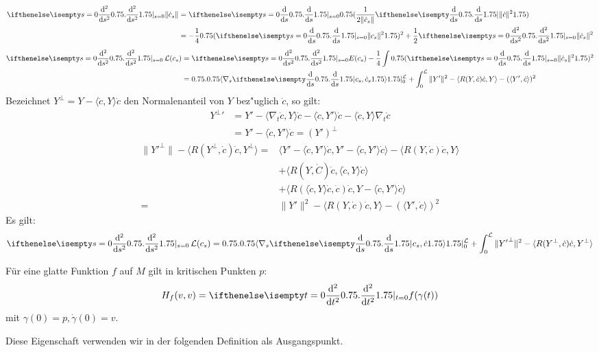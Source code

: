 \begin{align*}
  \difffrac[s=0]{^2}{s^2} \| \dot c_s \| &= \difffrac[s=0]{}{s} \left( \frac{1}{2 \| \dot c_s \|} \difffrac{}{s} \| \dot c \|^2 \right) \\
  &= - \frac{1}{4} \left( \difffrac[s=0]{}{s} \| c_s \|^2 \right)^2 +
  \frac{1}{2} \difffrac[s=0]{^2}{s^2} \| \dot c_s \|^2
\end{align*}
\begin{align*}
  \difffrac[s=0]{^2}{s^2} \calL(c_s) &= \difffrac[s=0]{^2}{s^2} E(c_s) - \frac{1}{4} \int \left( \difffrac[s=0]{}{s} \| \dot c_s \|^2 \right)^2 \\
  &= \left.\left\langle \nabla_s \difffrac{}{s} c_s, \dot c_s
    \right\rangle\right|_{0}^{\calL} + \int_0^{\calL} \| Y' \|^2 -
  \langle R(Y, \dot c) \dot c, Y \rangle - ( \langle Y', \dot c
  \rangle )^2
\end{align*}
Bezeichnet $Y^\perp = Y - \langle \dot c, Y \rangle \dot c$ den
Normalenanteil von $Y$ bez"uglich $\dot c$, so gilt:
\begin{align*}
  {Y^\perp}' &= Y' - \langle \nabla_t \dot c, Y \rangle \dot c - \langle \dot c, Y' \rangle \dot c - \langle \dot c, Y \rangle \nabla_t \dot c \\
  &= Y' - \langle \dot c, Y' \rangle \dot c = (Y')^\perp
\end{align*}
\begin{align*}
  \| {Y'}^\perp \| - \langle R(Y^\perp, \dot c) \dot c, Y^\perp \rangle ={}& \langle Y' - \langle \dot c, Y' \rangle \dot c, Y' - \langle \dot c, Y' \rangle \dot c \rangle - \langle R(Y, \dot c) \dot c, Y \rangle \\
  & + \langle R(Y, \dot C) \dot c, \langle \dot c, Y \rangle \dot c \rangle \\
  & + \langle R ( \langle \dot c, Y \rangle \dot c, \dot c) \dot c, Y - \langle \dot c, Y' \rangle \dot c \rangle \\
  ={}& \| Y' \|^2 - \langle R(Y, \dot c) \dot c, Y \rangle - ( \langle
  Y', \dot c \rangle )^2
\end{align*}
Es gilt:
\begin{align*}
  \difffrac[s=0]{^2}{s^2} \calL(c_s) = \left.\left\langle \nabla_s
      \difffrac{}{s} c_s, \dot c \right\rangle\right|_{0}^{\calL} +
  \int_0^{\calL} \| {Y'}^\perp \|^2 - \langle R(Y^\perp, \dot c) \dot
  c, Y^\perp \rangle
\end{align*}


\begin{emptythm}[Erinnerung]
  Für eine glatte Funktion $f$ auf $M$ gilt in kritischen Punkten $p$:
  \begin{align*}
    H_f(v,v) = \difffrac[t=0]{^2}{t^2}f(\gamma(t))
  \end{align*}
  mit $\gamma(0) = p, \dot\gamma(0) = v$.

  Diese Eigenschaft verwenden wir in der folgenden Definition als
  Ausgangspunkt.
\end{emptythm}

